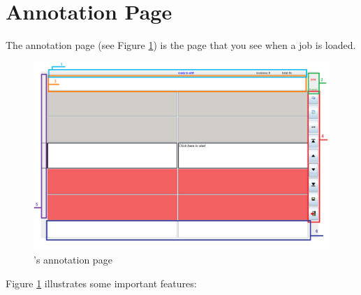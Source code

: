 \section{Annotation Page}

The annotation page (see Figure \ref{fig:annotation}) is the page that you see when a job is loaded.

\begin{figure}[h]\label{fig:annotation}
\includegraphics[width=1.0\textwidth]{img/annotation-page-colors}
\caption{\PET's annotation page}
\end{figure}

Figure \ref{fig:annotation} illustrates some important features:

